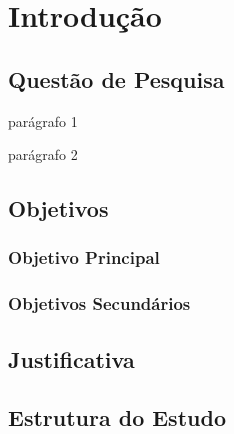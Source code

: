 
\chapter[Introdução]{Introdução}

\preencheComTexto

\section{Questão de Pesquisa}
\preencheComTexto

parágrafo 1

parágrafo 2



\section{Objetivos}
\preencheComTexto

\subsection{Objetivo Principal}
\preencheComTexto

\subsection{Objetivos Secundários}
\preencheComTexto

\section{Justificativa}
\preencheComTexto

\section{Estrutura do Estudo}
\preencheComTexto

